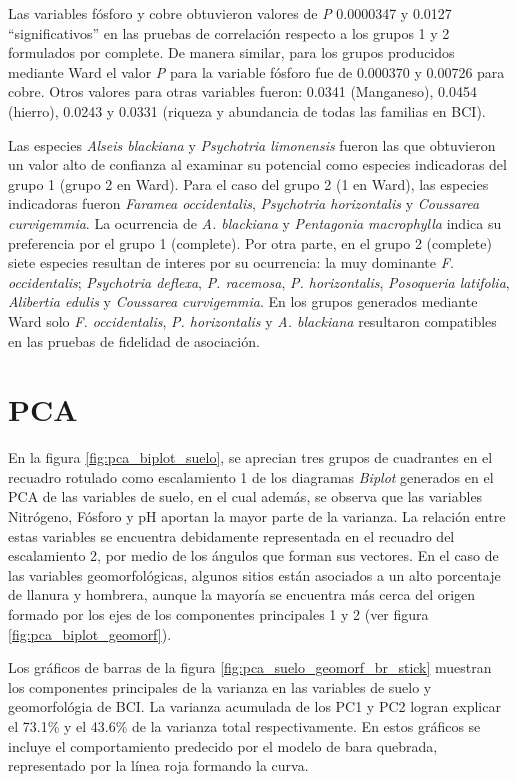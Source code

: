 \documentclass[11pt,]{article}
\begin{document}
Las variables fósforo y cobre obtuvieron valores de \emph{P} 0.0000347 y
0.0127 ``significativos'' en las pruebas de correlación respecto a los
grupos 1 y 2 formulados por complete. De manera similar, para los grupos
producidos mediante Ward el valor \emph{P} para la variable fósforo fue
de 0.000370 y 0.00726 para cobre. Otros valores para otras variables
fueron: 0.0341 (Manganeso), 0.0454 (hierro), 0.0243 y 0.0331 (riqueza y
abundancia de todas las familias en BCI).

Las especies \emph{Alseis blackiana} y \emph{Psychotria limonensis}
fueron las que obtuvieron un valor alto de confianza al examinar su
potencial como especies indicadoras del grupo 1 (grupo 2 en Ward). Para
el caso del grupo 2 (1 en Ward), las especies indicadoras fueron
\emph{Faramea occidentalis}, \emph{Psychotria horizontalis} y
\emph{Coussarea curvigemmia}. La ocurrencia de \emph{A. blackiana} y
\emph{Pentagonia macrophylla} indica su preferencia por el grupo 1
(complete). Por otra parte, en el grupo 2 (complete) siete especies
resultan de interes por su ocurrencia: la muy dominante \emph{F.
occidentalis}; \emph{Psychotria deflexa}, \emph{P. racemosa}, \emph{P.
horizontalis}, \emph{Posoqueria latifolia}, \emph{Alibertia edulis} y
\emph{Coussarea curvigemmia}. En los grupos generados mediante Ward solo
\emph{F. occidentalis}, \emph{P. horizontalis} y \emph{A. blackiana}
resultaron compatibles en las pruebas de fidelidad de asociación.

\section{PCA}\label{pca}

En la figura \ref{fig:pca_biplot_suelo}, se aprecian tres grupos de
cuadrantes en el recuadro rotulado como escalamiento 1 de los diagramas
\emph{Biplot} generados en el PCA de las variables de suelo, en el cual
además, se observa que las variables Nitrógeno, Fósforo y pH aportan la
mayor parte de la varianza. La relación entre estas variables se
encuentra debidamente representada en el recuadro del escalamiento 2,
por medio de los ángulos que forman sus vectores. En el caso de las
variables geomorfológicas, algunos sitios están asociados a un alto
porcentaje de llanura y hombrera, aunque la mayoría se encuentra más
cerca del origen formado por los ejes de los componentes principales 1 y
2 (ver figura \ref{fig:pca_biplot_geomorf}).

Los gráficos de barras de la figura \ref{fig:pca_suelo_geomorf_br_stick}
muestran los componentes principales de la varianza en las variables de
suelo y geomorfológia de BCI. La varianza acumulada de los PC1 y PC2
logran explicar el 73.1\% y el 43.6\% de la varianza total
respectivamente. En estos gráficos se incluye el comportamiento
predecido por el modelo de bara quebrada, representado por la línea roja
formando la curva.
\end{document}
